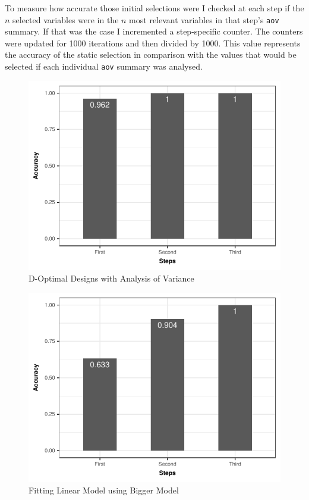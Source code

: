 \documentclass[final,12pt,a4paper]{article}
\begin{document}
To measure how accurate those initial selections were I checked at each step if
the \(n\) selected variables were in the \(n\) most relevant variables in that
step's \texttt{aov} summary. If that was the case I incremented a step-specific
counter. The counters were updated for 1000 iterations and then divided by 1000.
This value represents the accuracy of the static selection in comparison with
the values that would be selected if each individual \texttt{aov} summary was analysed.

\begin{figure}[htbp]
\centering
\includegraphics[width=0.6\columnwidth]{../img/doptaov_accuracy.pdf}
\caption{D-Optimal Designs with Analysis of Variance}
\end{figure}

\begin{figure}[htbp]
\centering
\includegraphics[width=0.6\columnwidth]{../img/lmbm_accuracy.pdf}
\caption{Fitting Linear Model using Bigger Model}
\end{figure}
\end{document}
